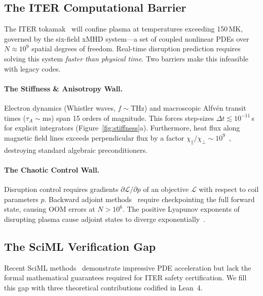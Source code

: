 \documentclass[11pt,twocolumn]{article}
\begin{document}
\subsection{The ITER Computational Barrier}

The ITER tokamak~\cite{pitts2019} will confine plasma at temperatures
exceeding 150\,MK, governed by the six-field xMHD system—a set of
coupled nonlinear PDEs over $N \approx 10^9$ spatial degrees of freedom.
Real-time disruption prediction requires solving this system \emph{faster
than physical time}. Two barriers make this infeasible with legacy codes.

\paragraph{The Stiffness \& Anisotropy Wall.}
Electron dynamics (Whistler waves, $f \sim \mathrm{THz}$) and macroscopic
Alfvén transit times ($\tau_A \sim \mathrm{ms}$) span 15 orders of
magnitude. This forces step-sizes $\Delta t \lesssim 10^{-11}$\,s for
explicit integrators (Figure~\ref{fig:stiffness}a). Furthermore, heat
flux along magnetic field lines exceeds perpendicular flux by a factor
$\chi_\parallel / \chi_\perp \sim 10^9$~\cite{gunter2005}, destroying
standard algebraic preconditioners.

\paragraph{The Chaotic Control Wall.}
Disruption control requires gradients $\partial\mathcal{L}/\partial p$
of an objective $\mathcal{L}$ with respect to coil parameters $p$.
Backward adjoint methods~\cite{hindmarsh2005} require checkpointing the
full forward state, causing OOM errors at $N > 10^6$. The positive
Lyapunov exponents of disrupting plasma cause adjoint states to diverge
exponentially~\cite{kates2019}.

\subsection{The SciML Verification Gap}

Recent SciML methods~\cite{li2021,lu2021,kochkov2021} demonstrate
impressive PDE acceleration but lack the formal mathematical guarantees
required for ITER safety certification. We fill this gap with three
theoretical contributions codified in Lean~4.
\end{document}
